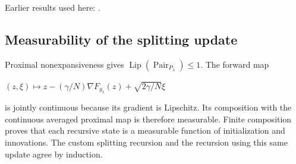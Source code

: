 \documentclass[11pt,a4paper]{report}
\begin{document}
Earlier results used here: \cite[Section~3.20]{LangevinLean2026ULASC}.
\subsection{\texorpdfstring{Measurability of the splitting update}{Measurability of the splitting update}}
\label{report-step-ProximalLangevin-SplittingLaw-lean-1}


Proximal nonexpansiveness gives \(\operatorname{Lip}(\operatorname{Pair}_{P_\lambda})\le1\). The forward map



\((z,\xi)\mapsto z-(\gamma/N)\nabla F_{g_1}(z)+\sqrt{2\gamma/N}\xi\)



is jointly continuous because its gradient is Lipschitz. Its composition with the continuous averaged proximal map is therefore measurable. Finite composition proves that each recursive state is a measurable function of initialization and innovations. The custom splitting recursion and the recursion using this same update agree by induction.
\end{document}
